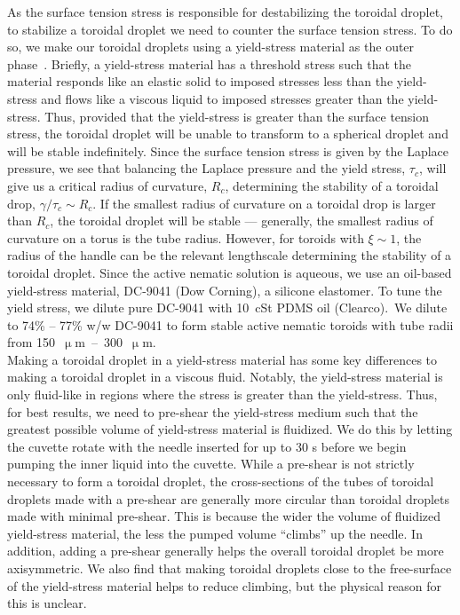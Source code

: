 As the surface tension stress is responsible for destabilizing the toroidal droplet, to stabilize a toroidal droplet we need to counter the surface tension stress.
To do so, we make our toroidal droplets using a yield-stress material as the outer phase~\cite{RN47,RN258}.
Briefly, a yield-stress material has a threshold stress such that the material responds like an elastic solid to imposed stresses less than the yield-stress and flows like a viscous liquid to imposed stresses greater than the yield-stress.
Thus, provided that the yield-stress is greater than the surface tension stress, the toroidal droplet will be unable to transform to a spherical droplet and will be stable indefinitely.
Since the surface tension stress is given by the Laplace pressure, we see that balancing the Laplace pressure and the yield stress, $\tau_c$, will give us a critical radius of curvature, $R_c$, determining the stability of a toroidal drop, $\gamma/\tau_c \sim R_c$.
If the smallest radius of curvature on a toroidal drop is larger than $R_c$, the toroidal droplet will be stable --- generally, the smallest radius of curvature on a torus is the tube radius.
However, for toroids with $\xi \sim 1$, the radius of the handle can be the relevant lengthscale determining the stability of a toroidal droplet.
Since the active nematic solution is aqueous, we use an oil-based yield-stress material, DC-9041 (Dow Corning), a silicone elastomer.
To tune the yield stress, we dilute pure DC-9041 with 10~cSt PDMS oil (Clearco).\
We dilute to 74\% -- 77\% w/w DC-9041 to form stable active nematic toroids with tube radii from 150~$\upmu$m~--~300~$\upmu$m.\\

Making a toroidal droplet in a yield-stress material has some key differences to making a toroidal droplet in a viscous fluid.
Notably, the yield-stress material is only fluid-like in regions where the stress is greater than the yield-stress.
Thus, for best results, we need to pre-shear the yield-stress medium such that the greatest possible volume of yield-stress material is fluidized.
We do this by letting the cuvette rotate with the needle inserted for up to 30 s before we begin pumping the inner liquid into the cuvette.
While a pre-shear is not strictly necessary to form a toroidal droplet, the cross-sections of the tubes of toroidal droplets made with a pre-shear are generally more circular than toroidal droplets made with minimal pre-shear.
This is because the wider the volume of fluidized yield-stress material, the less the pumped volume ``climbs'' up the needle.
In addition, adding a pre-shear generally helps the overall toroidal droplet be more axisymmetric.
We also find that making toroidal droplets close to the free-surface of the yield-stress material helps to reduce climbing, but the physical reason for this is unclear.\\

